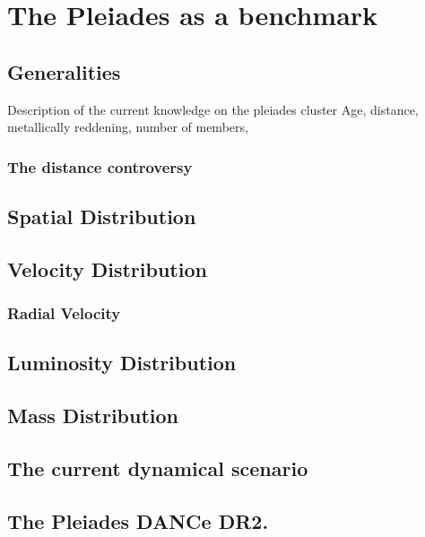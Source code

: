 \chapter{The Pleiades as a benchmark}
\label{chap:Pleiades}

\section{Generalities}

Description of the current knowledge on the pleiades cluster
Age, distance, metallically reddening, number of members, 

\subsection{The distance controversy}

\section{Spatial Distribution}

\section{Velocity Distribution}
\subsection{Radial Velocity}

\section{Luminosity Distribution}

\section{Mass Distribution}

\section{The current dynamical scenario}

\section{The Pleiades DANCe DR2.}
